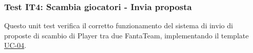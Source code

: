 \begin{comment}
Questo unit test verifica il corretto funzionamento del sistema di visualizzazione della classifica,
implementando il template XXXXXXXX \todo{collegare al template}.

\begin{lstlisting}[language=Java]
@Test
void testGetStandings() {

	entityManager.getTransaction().begin();
		
	FantaUser user = new FantaUser("user@test.com", "pwd");
	fantaUserRepository.saveFantaUser(user);

	NewsPaper newsPaper = new NewsPaper("Gazzetta");
	newspaperRepository.saveNewsPaper(newsPaper);

	League league = new League(user, "Test League", newsPaper, "L003");
	leagueRepository.saveLeague(league);

	FantaTeam team1 = new FantaTeam("Team1", league, 10, user, new HashSet<>());
	FantaTeam team2 = new FantaTeam("Team2", league, 70, user, new HashSet<>());
	fantaTeamRepository.saveTeam(team1);
	fantaTeamRepository.saveTeam(team2);
		
	entityManager.getTransaction().commit();

	List<FantaTeam> standings = userService.getStandings(league);

	assertThat(standings.get(0).getName()).isEqualTo("Team2");
	assertThat(standings.get(1).getName()).isEqualTo("Team1");
}
\end{lstlisting}

\end{comment}

\subsubsection{Test IT4: Scambia giocatori - Invia proposta} \label{IT4}

Questo unit test verifica il corretto funzionamento del sistema di invio di proposte di scambio di Player tra due FantaTeam,
implementando il template \hyperref[UC-04]{UC-04}.

